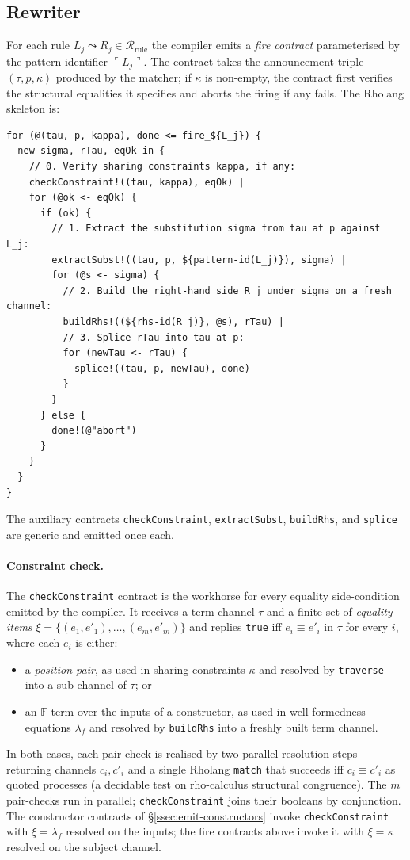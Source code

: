 \documentclass[11pt]{article}
\theoremstyle{plain}
\theoremstyle{definition}
\theoremstyle{remark}
\newcommand{\reflect}[1]{\ulcorner #1 \urcorner}
\newcommand{\rew}{\leadsto}
\begin{document}
\subsection{Rewriter}\label{ssec:rewriter}

For each rule $L_j \rew R_j \in \mathcal{R}_{\mathrm{rule}}$ the compiler
emits a \emph{fire contract} parameterised by the pattern identifier
$\reflect{L_j}$. The contract takes the announcement triple
$(\tau, p, \kappa)$ produced by the matcher; if $\kappa$ is non-empty,
the contract first verifies the structural equalities it specifies and
aborts the firing if any fails. The Rholang skeleton is:
\begin{lstlisting}
for (@(tau, p, kappa), done <= fire_${L_j}) {
  new sigma, rTau, eqOk in {
    // 0. Verify sharing constraints kappa, if any:
    checkConstraint!((tau, kappa), eqOk) |
    for (@ok <- eqOk) {
      if (ok) {
        // 1. Extract the substitution sigma from tau at p against L_j:
        extractSubst!((tau, p, ${pattern-id(L_j)}), sigma) |
        for (@s <- sigma) {
          // 2. Build the right-hand side R_j under sigma on a fresh channel:
          buildRhs!((${rhs-id(R_j)}, @s), rTau) |
          // 3. Splice rTau into tau at p:
          for (newTau <- rTau) {
            splice!((tau, p, newTau), done)
          }
        }
      } else {
        done!(@"abort")
      }
    }
  }
}
\end{lstlisting}
The auxiliary contracts \texttt{checkConstraint}, \texttt{extractSubst},
\texttt{buildRhs}, and \texttt{splice} are generic and emitted once each.

\paragraph{Constraint check.}
The \texttt{checkConstraint} contract is the workhorse for every
equality side-condition emitted by the compiler. It receives a
term channel $\tau$ and a finite set of \emph{equality items}
$\xi = \{(e_1, e'_1), \ldots, (e_m, e'_m)\}$ and replies \texttt{true}
iff $e_i \equiv e'_i$ in $\tau$ for every $i$, where each $e_i$ is
either:
\begin{itemize}[leftmargin=*]
  \item a \emph{position pair}, as used in sharing constraints $\kappa$
        and resolved by \texttt{traverse} into a sub-channel of $\tau$; or
  \item an $\mathbb{F}$-term over the inputs of a constructor, as used in
        well-formedness equations $\lambda_f$ and resolved by
        \texttt{buildRhs} into a freshly built term channel.
\end{itemize}
In both cases, each pair-check is realised by two parallel resolution
steps returning channels $c_i, c'_i$ and a single Rholang \texttt{match}
that succeeds iff $c_i \equiv c'_i$ as quoted processes (a decidable
test on rho-calculus structural congruence). The $m$ pair-checks run
in parallel; \texttt{checkConstraint} joins their booleans by
conjunction. The constructor contracts of \S\ref{ssec:emit-constructors}
invoke \texttt{checkConstraint} with $\xi = \lambda_f$ resolved on the
inputs; the fire contracts above invoke it with $\xi = \kappa$
resolved on the subject channel.
\end{document}
